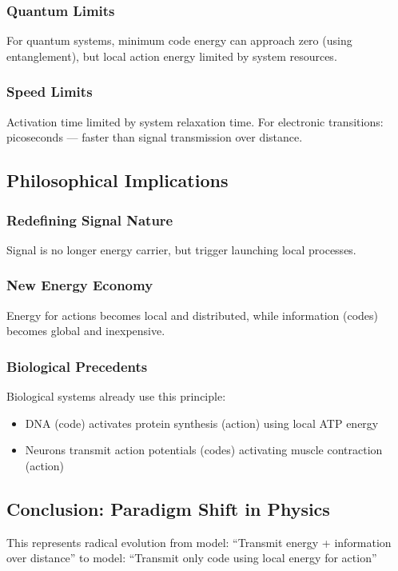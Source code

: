 \documentclass[11pt,a4paper]{article}
\begin{document}
	\subsubsection{Quantum Limits}
	For quantum systems, minimum code energy can approach zero (using entanglement), but local action energy limited by system resources.
	
	\subsubsection{Speed Limits}
	Activation time limited by system relaxation time. For electronic transitions: picoseconds — faster than signal transmission over distance.
	
	\subsection{Philosophical Implications}
	
	\subsubsection{Redefining Signal Nature}
	Signal is no longer energy carrier, but trigger launching local processes.
	
	\subsubsection{New Energy Economy}
	Energy for actions becomes local and distributed, while information (codes) becomes global and inexpensive.
	
	\subsubsection{Biological Precedents}
	Biological systems already use this principle:
	\begin{itemize}
		\item DNA (code) activates protein synthesis (action) using local ATP energy
		\item Neurons transmit action potentials (codes) activating muscle contraction (action)
	\end{itemize}
	
	\subsection{Conclusion: Paradigm Shift in Physics}
	
	This represents radical evolution from model:
	``Transmit energy + information over distance''
	to model:
	``Transmit only code using local energy for action''
	
\end{document}
